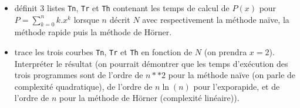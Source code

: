 
\begin{itemize}
\item définit 3 listes \texttt{Tn}, \texttt{Tr} et \texttt{Th} contenant les temps de calcul de $P(x)$ pour $P=\displaystyle\sum_{k=0}^n k.x^k$ lorsque $n$ décrit $N$ avec respectivement la méthode naïve, la méthode rapide puis la méthode de Hörner.\\
\item trace les trois courbes  \texttt{Tn}, \texttt{Tr} et \texttt{Th} en fonction de $N$ (on prendra $x=2$). Interpréter le résultat (on pourrait démontrer que les temps d'exécution des trois programmes sont de l'ordre de $n**2$ pour la méthode naïve (on parle de complexité quadratique), de l'ordre de $n\ln(n)$ pour l'exporapide, et de l'ordre de $n$ pour la méthode de Hörner (complexité linéaire)). 
\end{itemize}
	
